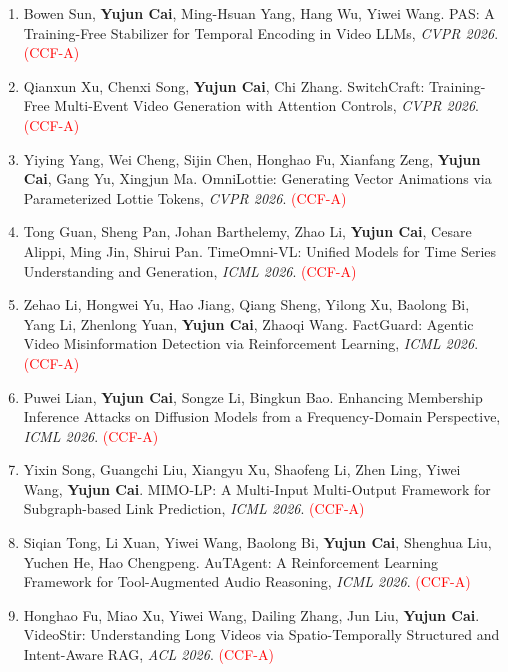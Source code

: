 \documentclass[UTF8,a4paper,11pt,fontset=fandol]{ctexart}
\begin{document}
\begin{enumerate}
\item Bowen Sun, \textbf{Yujun Cai}, Ming-Hsuan Yang, Hang Wu, Yiwei Wang. PAS: A Training-Free Stabilizer for Temporal Encoding in Video LLMs, \textit{CVPR 2026}. \textcolor{red}{(CCF-A)}

\item Qianxun Xu, Chenxi Song, \textbf{Yujun Cai}, Chi Zhang. SwitchCraft: Training-Free Multi-Event Video Generation with Attention Controls, \textit{CVPR 2026}. \textcolor{red}{(CCF-A)}

\item Yiying Yang, Wei Cheng, Sijin Chen, Honghao Fu, Xianfang Zeng, \textbf{Yujun Cai}, Gang Yu, Xingjun Ma. OmniLottie: Generating Vector Animations via Parameterized Lottie Tokens, \textit{CVPR 2026}. \textcolor{red}{(CCF-A)}

\item Tong Guan, Sheng Pan, Johan Barthelemy, Zhao Li, \textbf{Yujun Cai}, Cesare Alippi, Ming Jin, Shirui Pan. TimeOmni-VL: Unified Models for Time Series Understanding and Generation, \textit{ICML 2026}. \textcolor{red}{(CCF-A)}

\item Zehao Li, Hongwei Yu, Hao Jiang, Qiang Sheng, Yilong Xu, Baolong Bi, Yang Li, Zhenlong Yuan, \textbf{Yujun Cai}, Zhaoqi Wang. FactGuard: Agentic Video Misinformation Detection via Reinforcement Learning, \textit{ICML 2026}. \textcolor{red}{(CCF-A)}

\item Puwei Lian, \textbf{Yujun Cai}, Songze Li, Bingkun Bao. Enhancing Membership Inference Attacks on Diffusion Models from a Frequency-Domain Perspective, \textit{ICML 2026}. \textcolor{red}{(CCF-A)}

\item Yixin Song, Guangchi Liu, Xiangyu Xu, Shaofeng Li, Zhen Ling, Yiwei Wang, \textbf{Yujun Cai}. MIMO-LP: A Multi-Input Multi-Output Framework for Subgraph-based Link Prediction, \textit{ICML 2026}. \textcolor{red}{(CCF-A)}

\item Siqian Tong, Li Xuan, Yiwei Wang, Baolong Bi, \textbf{Yujun Cai}, Shenghua Liu, Yuchen He, Hao Chengpeng. AuTAgent: A Reinforcement Learning Framework for Tool-Augmented Audio Reasoning, \textit{ICML 2026}. \textcolor{red}{(CCF-A)}

\item Honghao Fu, Miao Xu, Yiwei Wang, Dailing Zhang, Jun Liu, \textbf{Yujun Cai}. VideoStir: Understanding Long Videos via Spatio-Temporally Structured and Intent-Aware RAG, \textit{ACL 2026}. \textcolor{red}{(CCF-A)}


\end{enumerate}
\end{document}
